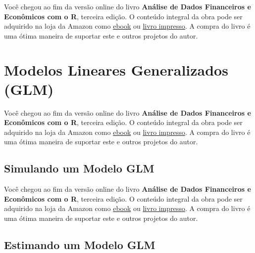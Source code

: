 \documentclass[
  11pt,
]{book}
\newenvironment{pleasebuyit}
{\begin{noteblock}
		
	} {\end{noteblock}}
\begin{document}
\begin{pleasebuyit}
Você chegou ao fim da versão online do livro \textbf{Análise de Dados
Financeiros e Econômicos com o R}, terceira edição. O conteúdo integral
da obra pode ser adquirido na loja da Amazon como
\href{https://www.amazon.com.br/dp/B08WNC27ZY}{ebook} ou
\href{https://www.amazon.com/dp/B08WP8CCDB}{livro impresso}. A compra do
livro é uma ótima maneira de suportar este e outros projetos do autor.
\end{pleasebuyit}

\hypertarget{modelos-lineares-generalizados-glm}{%
\section{Modelos Lineares Generalizados (GLM)}\label{modelos-lineares-generalizados-glm}}

\begin{pleasebuyit}
Você chegou ao fim da versão online do livro \textbf{Análise de Dados
Financeiros e Econômicos com o R}, terceira edição. O conteúdo integral
da obra pode ser adquirido na loja da Amazon como
\href{https://www.amazon.com.br/dp/B08WNC27ZY}{ebook} ou
\href{https://www.amazon.com/dp/B08WP8CCDB}{livro impresso}. A compra do
livro é uma ótima maneira de suportar este e outros projetos do autor.
\end{pleasebuyit}

\hypertarget{simulando-um-modelo-glm}{%
\subsection{Simulando um Modelo GLM}\label{simulando-um-modelo-glm}}

\begin{pleasebuyit}
Você chegou ao fim da versão online do livro \textbf{Análise de Dados
Financeiros e Econômicos com o R}, terceira edição. O conteúdo integral
da obra pode ser adquirido na loja da Amazon como
\href{https://www.amazon.com.br/dp/B08WNC27ZY}{ebook} ou
\href{https://www.amazon.com/dp/B08WP8CCDB}{livro impresso}. A compra do
livro é uma ótima maneira de suportar este e outros projetos do autor.
\end{pleasebuyit}

\hypertarget{estimando-um-modelo-glm}{%
\subsection{Estimando um Modelo GLM}\label{estimando-um-modelo-glm}}
\end{document}
